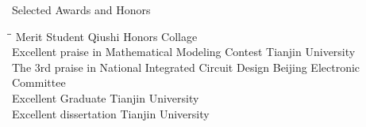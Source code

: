 
\begin{rSection}{Selected Awards and Honors}
\begin{tabbing}
\hspace{3.3in}\= \hspace{2.1in}\= \kill
    Merit Student                             \> Qiushi Honors Collage                       \\
    Excellent praise in Mathematical Modeling Contest                            \> Tianjin University                      \\
    The 3rd praise in National Integrated Circuit Design                 \>Beijing Electronic Committee                         \\
    Excellent Graduate                  \> Tianjin University                    \\
    Excellent dissertation                 \> Tianjin University                       \\
 \end{tabbing}
\end{rSection}

